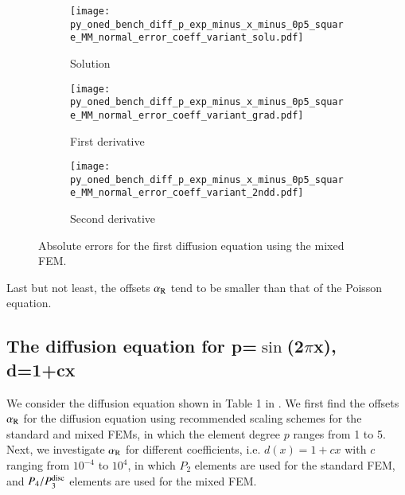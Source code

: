 \documentclass[review,3p]{elsarticle}
\begin{document}
\begin{figure}[!ht]
    \begin{subfigure}{5.5cm}
        \texttt{[image: py\_oned\_bench\_diff\_p\_exp\_minus\_x\_minus\_0p5\_square\_MM\_normal\_error\_coeff\_variant\_solu.pdf]}
        \caption{Solution}
        \label{py_oned_bench_diff_p_exp_minus_x_minus_0p5_square_MM_normal_error_coeff_variant_solu}
    \end{subfigure}
    \hspace{-0.2cm}
    \begin{subfigure}{5.5cm}
        \texttt{[image: py\_oned\_bench\_diff\_p\_exp\_minus\_x\_minus\_0p5\_square\_MM\_normal\_error\_coeff\_variant\_grad.pdf]}
        \caption{First derivative}
        \label{py_oned_bench_diff_p_exp_minus_x_minus_0p5_square_MM_normal_error_coeff_variant_grad}
    \end{subfigure}
    \hspace{-0.2cm}
    \begin{subfigure}{5.5cm}
        \texttt{[image: py\_oned\_bench\_diff\_p\_exp\_minus\_x\_minus\_0p5\_square\_MM\_normal\_error\_coeff\_variant\_2ndd.pdf]}
        \caption{Second derivative}
        \label{py_oned_bench_diff_p_exp_minus_x_minus_0p5_square_MM_normal_error_coeff_variant_2ndd}
    \end{subfigure}
\caption{Absolute errors for the first diffusion equation using the mixed FEM.}
\label{py_oned_bench_diff_p_exp_minus_x_minus_0p5_square_MM_normal_error_coeff_variant}
\end{figure}

Last but not least, the offsets $\alpha_{\rm R}$ tend to be smaller than that of the Poisson equation.

% 
\newpage
\subsection{\texorpdfstring{The diffusion equation for p=$\sin$(2$\pi$x), d=1+cx}{The diffusion equation for p=sin(2pix), d=1+cx}} \label{discretization_error_bench_diff}

We consider the diffusion equation shown in Table 1 in \cite{liu2019balancing}.
We first find the offsets $\alpha_{\rm R}$ for the diffusion equation using recommended scaling schemes for the standard and mixed FEMs, in which the element degree $p$ ranges from 1 to 5.
Next, we investigate $\alpha_{\rm R}$ for different coefficients, i.e. $d(x)=1+cx$ with $c$ ranging from $10^{-4}$ to $10^4$, in which $P_2$ elements are used for the standard FEM, and $P_4/P_3^{\rm disc}$ elements are used for the mixed FEM.
\end{document}
